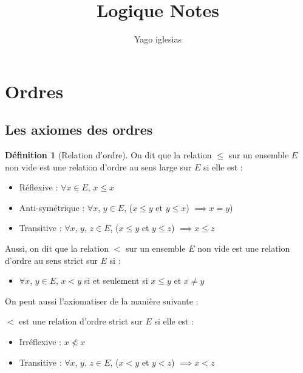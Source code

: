 \documentclass{article}
\theoremstyle{definition}
\newtheorem{definition}{Définition}
\theoremstyle{definition}
\theoremstyle{definition}
\theoremstyle{plain}
\theoremstyle{theorem}
\theoremstyle{theorem}
\begin{document}
\title{Logique Notes}
\author{Yago iglesias}
\maketitle
\tableofcontents


\section{Ordres}

\subsection{Les axiomes des ordres}


\begin{definition}[Relation d'ordre]

    On dit que la relation $\leqslant$ sur un ensemble $E$ non vide est une relation d'ordre au sens large sur $E$ si elle est :
    \begin{itemize}
        \item Réflexive : $\forall x \in E$, $x \leqslant x$
        \item Anti-symétrique : $\forall x$, $y \in E$, ($x \leqslant y$ et $y \leqslant x$) $\implies x = y$)
        \item Transitive : $\forall x$, $y$, $z \in E$, ($x \leqslant y$ et $y \leqslant z$) $\implies x \leqslant z$
    \end{itemize}
    
    Aussi, on dit que la relation $<$ sur un ensemble $E$ non vide est une relation d'ordre au sens strict sur $E$ si :
    \begin{itemize}
        \item $\forall x$, $y \in E$, $x < y$ si et seulement si $x \leqslant y$ et $x \ne y$
    \end{itemize}
    On peut aussi l'axiomatiser de la manière suivante :

    $<$ est une relation d'ordre strict sur $E$ si elle est :
    \begin{itemize}
        \item Irréflexive : $x \nless x$
        \item Transitive : $\forall x$, $y$, $z \in E$, ($x < y$ et $y < z$) $\implies x < z$

    \end{itemize}

\end{definition}
    
\end{document}
